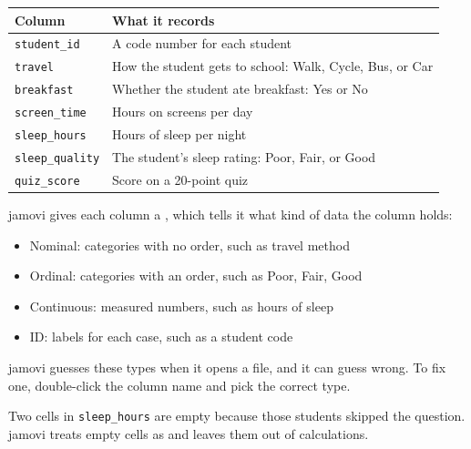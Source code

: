 \begin{center}
\begin{tabular}{|l|p{9cm}|}
\hline
Column & What it records \\
\hline
\texttt{student\_id} & A code number for each student \\
\hline
\texttt{travel} & How the student gets to school: Walk, Cycle, Bus, or Car \\
\hline
\texttt{breakfast} & Whether the student ate breakfast: Yes or No \\
\hline
\texttt{screen\_time} & Hours on screens per day \\
\hline
\texttt{sleep\_hours} & Hours of sleep per night \\
\hline
\texttt{sleep\_quality} & The student's sleep rating: Poor, Fair, or Good \\
\hline
\texttt{quiz\_score} & Score on a 20-point quiz \\
\hline
\end{tabular}
\end{center}

jamovi gives each column a , which tells it what kind of data the column holds:
\begin{itemize}
    \item Nominal: categories with no order, such as travel method
    \item Ordinal: categories with an order, such as Poor, Fair, Good
    \item Continuous: measured numbers, such as hours of sleep
    \item ID: labels for each case, such as a student code
\end{itemize}

jamovi guesses these types when it opens a file, and it can guess wrong. To fix one, double-click the column name and pick the correct type.

Two cells in \texttt{sleep\_hours} are empty because those students skipped the question. jamovi treats empty cells as  and leaves them out of calculations.

